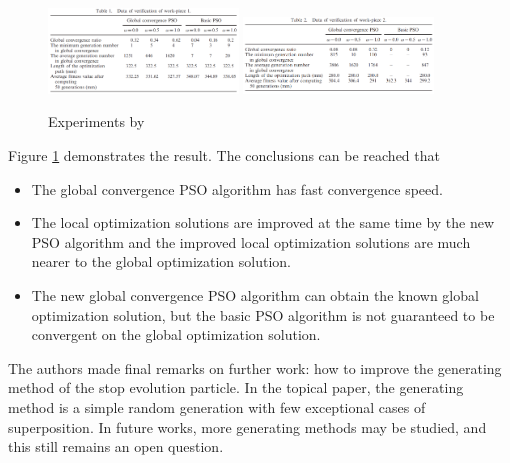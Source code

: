 \documentclass{IEEEtran}
\begin{document}
{{        \begin{figure}[!htbp]
            \centering
            \includegraphics[width=0.45\textwidth]{figures/drilling_test_1.png}
            \includegraphics[width=0.45\textwidth]{figures/drilling_test_2.png}
            \caption{Experiments by \cite{zhu2008drilling}}
            \label{fig:drilling_tests}
        \end{figure}

        Figure \ref{fig:drilling_tests} demonstrates the result. The conclusions can be reached that \cite{zhu2008drilling}
        \begin{itemize}
            \item The global convergence PSO algorithm has fast convergence speed.
            \item The local optimization solutions are improved at the same time by the new PSO algorithm 
            and the improved local optimization solutions are much nearer to the global optimization solution.
            \item The new global convergence PSO algorithm can obtain the known global optimization solution, 
            but the basic PSO algorithm is not guaranteed to be convergent on the global optimization solution.
        \end{itemize}

        The authors made final remarks on further work: how to improve the generating method of the stop evolution particle. 
        In the topical paper, the generating method is a simple random generation with few exceptional cases of superposition.
        In future works, more generating methods may be studied, and this still remains an open question.
    }
}



\end{document}
